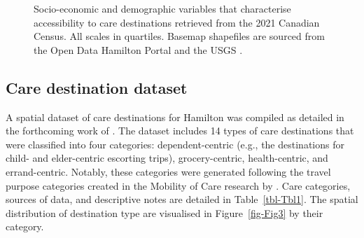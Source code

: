 \documentclass[
  authoryear,
  preprint,
  3p]{elsarticle}
\begin{document}
\begin{figure}


\caption{\label{fig-Fig2}Socio-economic and demographic variables that
characterise accessibility to care destinations retrieved from the 2021
Canadian Census. All scales in quartiles. Basemap shapefiles are sourced
from the Open Data Hamilton Portal
\citep{opendatahamiltonCityBoundary2023} and the USGS
\citep{greatlakesUSGS2010}.}

\end{figure}%

\newpage

\subsection{Care destination dataset}\label{care-destination-dataset}

A spatial dataset of care destinations for Hamilton was compiled as
detailed in the forthcoming work of \citet{soukhovforthcoming2024}. The
dataset includes 14 types of care destinations that were classified into
four categories: dependent-centric (e.g., the destinations for child-
and elder-centric escorting trips), grocery-centric, health-centric, and
errand-centric. Notably, these categories were generated following the
travel purpose categories created in the Mobility of Care research by
\citet{sanchezdemadariagaMeasuringMobilitiesCare2019}. Care categories,
sources of data, and descriptive notes are detailed in
Table~\ref{tbl-Tbl1}. The spatial distribution of destination type are
visualised in Figure~\ref{fig-Fig3} by their category.
\end{document}
